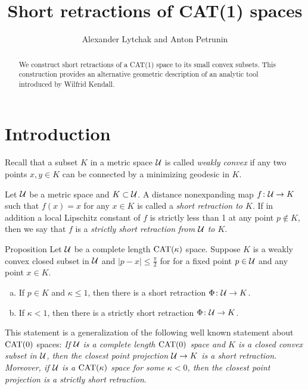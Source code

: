 \documentclass[oneside,a4paper, 12pt]{article}
\begin{document}
\title{Short retractions of CAT(1) spaces}
\author{Alexander Lytchak and Anton Petrunin}
\date{}
\maketitle

\begin{abstract}
We construct short retractions of a CAT(1) space to its small convex subsets.
This construction provides an alternative geometric description of an analytic tool introduced by Wilfrid Kendall. 
\end{abstract}


\section{Introduction}

Recall that a  subset $K$ in a metric space ${\mathcal{U}}$ is called \emph{weakly convex} if any two points $x,y\in K$ can be connected by a minimizing geodesic in $K$.

Let ${\mathcal{U}}$ be a metric space and $K\subset {\mathcal{U}}$.
A distance nonexpanding map $f\colon{\mathcal{U}}\to K$ such that $f(x)=x$ for any $x\in K$ is called a \emph{short retraction to $K$}.
If in addition a local Lipschitz constant of $f$ is strictly less than 1 at any point $p\notin K$, 
then we say that $f$ is a \emph{strictly short retraction from ${\mathcal{U}}$ to $K$}.

\begin{thm}{Proposition}\label{thm:retraction:Phi}
Let $\mathcal{U}$ be a complete length $\mathrm{CAT}(\kappa)$ space.
Suppose $K$ is a weakly convex closed subset in $\mathcal{U}$ and $|p-x|\le \tfrac\pi2$ for for a fixed point $p\in \mathcal{U}$ and any point $x\in K$.


\begin{enumerate}[(a)]
 \item If $p\in K$ and $\kappa\le 1$, then there is a short retraction 
$\Phi\colon\mathcal{U}\to K$.
\item If $\kappa<1$, then there is a strictly short retraction 
$\Phi\colon\mathcal{U}\to K$.
\end{enumerate}
\end{thm}

This statement is a generalization of the following well known statement about $\mathrm{CAT}(0)$ spaces:
\emph{If ${\mathcal{U}}$ is a complete length $\mathrm{CAT}(0)$ space and $K$ is a closed convex subset in ${\mathcal{U}}$,
then the closest point projection ${\mathcal{U}}\to K$ is a short retraction.
Moreover, if $\mathcal{U}$ is a $\mathrm{CAT}(\kappa)$ space for some $\kappa<0$, then  the closest point projection is a strictly short retraction}.
\end{document}
